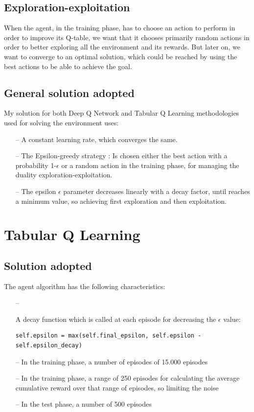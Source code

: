 \documentclass{article}
\begin{document}
\subsection{Exploration-exploitation}

When the agent, in the training phase, has to choose an action to perform in order to improve its Q-table, we want that it chooses primarily random actions in order to better exploring all the environment and its rewards.
But later on, we want to converge to an optimal solution, which could be reached by using the best actions to be able to achieve the goal.


\subsection{General solution adopted}


My solution for both Deep Q Network and Tabular Q Learning methodologies used for solving the environment uses:
\begin{itemize}
\item[--] A constant learning rate, which converges the same.
\item[--] The Epsilon-greedy strategy : Is chosen either the best action with a probability 1-$\epsilon$ or a random action in the training phase, for managing the duality exploration-exploitation.
\item[--] The epsilon $\epsilon$ parameter decreases linearly with a decay factor, until reaches a minimum value, so achieving first exploration and then exploitation.
\end{itemize}



\section{Tabular Q Learning}

\subsection{Solution adopted}

The agent algorithm has the following characteristics:
\begin{itemize}
\item[--] {A decay function which is called at each episode for decreasing the $\epsilon$ value:
\begin{verbatim}
self.epsilon = max(self.final_epsilon, self.epsilon - self.epsilon_decay)
\end{verbatim}
}
\item[--] In the training phase, a number of episodes of 15.000 episodes
\item[--] In the training phase, a range of 250 episodes for calculating the average cumulative reward over that range of episodes, so limiting the noise
\item[--] In the test phase, a number of 500 episodes
\end{itemize}
\end{document}
